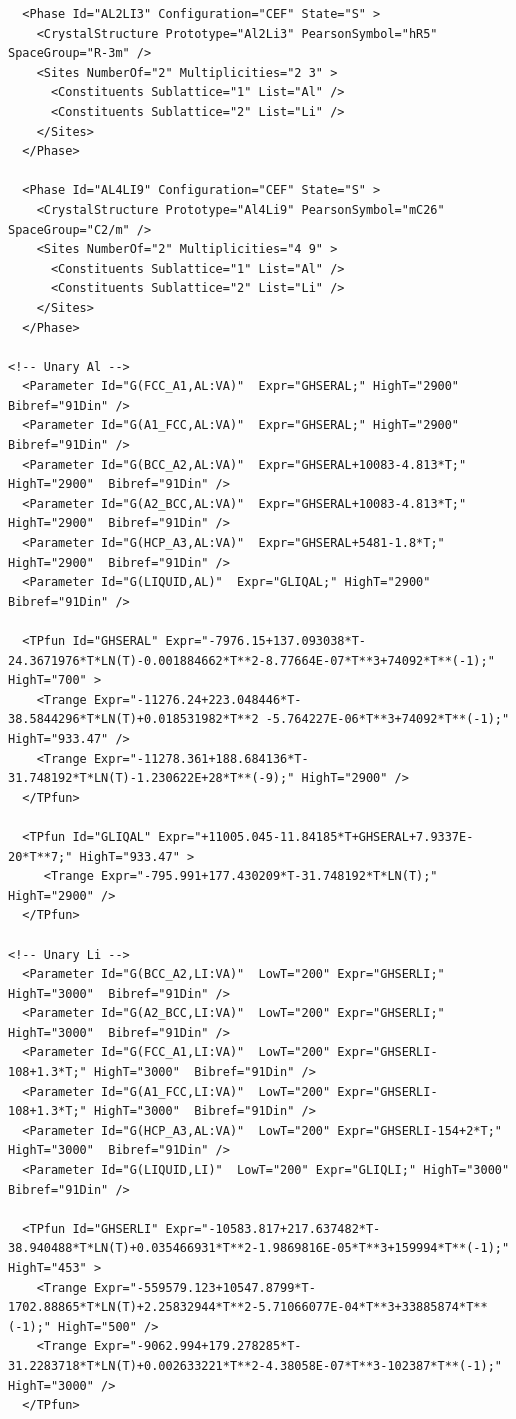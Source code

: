 \documentclass{article}
\begin{document}
\begin{appendices}
\begin{verbatim}
  <Phase Id="AL2LI3" Configuration="CEF" State="S" >
	<CrystalStructure Prototype="Al2Li3" PearsonSymbol="hR5" SpaceGroup="R-3m" />
    <Sites NumberOf="2" Multiplicities="2 3" >
      <Constituents Sublattice="1" List="Al" />
      <Constituents Sublattice="2" List="Li" />
    </Sites>
  </Phase>

  <Phase Id="AL4LI9" Configuration="CEF" State="S" >
	<CrystalStructure Prototype="Al4Li9" PearsonSymbol="mC26" SpaceGroup="C2/m" />
    <Sites NumberOf="2" Multiplicities="4 9" >
      <Constituents Sublattice="1" List="Al" />
      <Constituents Sublattice="2" List="Li" />
    </Sites>
  </Phase>

<!-- Unary Al -->
  <Parameter Id="G(FCC_A1,AL:VA)"  Expr="GHSERAL;" HighT="2900"  Bibref="91Din" />
  <Parameter Id="G(A1_FCC,AL:VA)"  Expr="GHSERAL;" HighT="2900"  Bibref="91Din" />
  <Parameter Id="G(BCC_A2,AL:VA)"  Expr="GHSERAL+10083-4.813*T;" HighT="2900"  Bibref="91Din" />
  <Parameter Id="G(A2_BCC,AL:VA)"  Expr="GHSERAL+10083-4.813*T;" HighT="2900"  Bibref="91Din" />
  <Parameter Id="G(HCP_A3,AL:VA)"  Expr="GHSERAL+5481-1.8*T;" HighT="2900"  Bibref="91Din" />
  <Parameter Id="G(LIQUID,AL)"  Expr="GLIQAL;" HighT="2900"  Bibref="91Din" />

  <TPfun Id="GHSERAL" Expr="-7976.15+137.093038*T-24.3671976*T*LN(T)-0.001884662*T**2-8.77664E-07*T**3+74092*T**(-1);" HighT="700" >
    <Trange Expr="-11276.24+223.048446*T-38.5844296*T*LN(T)+0.018531982*T**2 -5.764227E-06*T**3+74092*T**(-1);" HighT="933.47" /> 
    <Trange Expr="-11278.361+188.684136*T-31.748192*T*LN(T)-1.230622E+28*T**(-9);" HighT="2900" /> 
  </TPfun>

  <TPfun Id="GLIQAL" Expr="+11005.045-11.84185*T+GHSERAL+7.9337E-20*T**7;" HighT="933.47" >
     <Trange Expr="-795.991+177.430209*T-31.748192*T*LN(T);" HighT="2900" /> 
  </TPfun>

<!-- Unary Li -->
  <Parameter Id="G(BCC_A2,LI:VA)"  LowT="200" Expr="GHSERLI;" HighT="3000"  Bibref="91Din" />
  <Parameter Id="G(A2_BCC,LI:VA)"  LowT="200" Expr="GHSERLI;" HighT="3000"  Bibref="91Din" />
  <Parameter Id="G(FCC_A1,LI:VA)"  LowT="200" Expr="GHSERLI-108+1.3*T;" HighT="3000"  Bibref="91Din" />
  <Parameter Id="G(A1_FCC,LI:VA)"  LowT="200" Expr="GHSERLI-108+1.3*T;" HighT="3000"  Bibref="91Din" />
  <Parameter Id="G(HCP_A3,AL:VA)"  LowT="200" Expr="GHSERLI-154+2*T;" HighT="3000"  Bibref="91Din" />
  <Parameter Id="G(LIQUID,LI)"  LowT="200" Expr="GLIQLI;" HighT="3000"  Bibref="91Din" />

  <TPfun Id="GHSERLI" Expr="-10583.817+217.637482*T-38.940488*T*LN(T)+0.035466931*T**2-1.9869816E-05*T**3+159994*T**(-1);" HighT="453" >
    <Trange Expr="-559579.123+10547.8799*T-1702.88865*T*LN(T)+2.25832944*T**2-5.71066077E-04*T**3+33885874*T**(-1);" HighT="500" /> 
    <Trange Expr="-9062.994+179.278285*T-31.2283718*T*LN(T)+0.002633221*T**2-4.38058E-07*T**3-102387*T**(-1);" HighT="3000" /> 
  </TPfun>


\end{verbatim}
\end{appendices}
\end{document}

